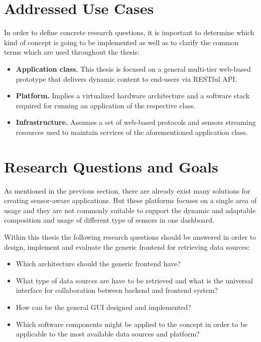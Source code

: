\section{Addressed Use Cases}
     In order to define concrete research questions, it is important to determine which kind of concept is going to be implemented as well as to clarify the common terms which are used throughout the thesis:
     \begin{itemize}
          \item \textbf{Application class.} This thesis is focused on a general multi-tier web-based prototype that delivers dynamic content to end-users via RESTful API.

          \item \textbf{Platform.} Implies a virtualized hardware architecture and a software stack required for running an application of the respective class.

          \item \textbf{Infrastructure.} Assumes a set of web-based protocols and sensors streaming resources used to maintain services of the aforementioned application class.
     \end{itemize}


\section{Research Questions and Goals}
       As mentioned in the previous section, there are already exist many solutions for creating sensor-aware applications. But these platforms focuses on a single area of usage and they are not commonly suitable to support the dynamic and adaptable composition and usage of different type of sensors in one dashboard.

       Within this thesis the following research questions should be answered in order to design, implement and evaluate the generic frontend for retrieving data sources: 
       \begin{itemize}
       \item Which architecture should the generic frontend have?
       \item What type of data sources are have to be retrieved and what is the universal interface for collaboration between backend and frontend system?
       \item How can be the general GUI designed and implemented?
       \item Which software components might be applied to the concept in order to be applicable to the most available data sources and platform?
       \end{itemize}

